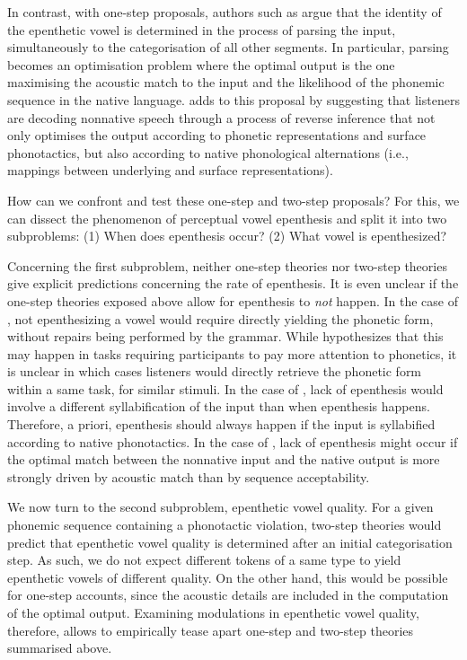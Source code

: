In contrast, with one-step proposals, authors such as \cite{dupoux2011} argue that the identity of the epenthetic vowel is determined in the process of parsing the input, simultaneously to the categorisation of all other segments. In particular, parsing becomes an optimisation problem where the optimal output is the one maximising the acoustic match to the input and the likelihood of the phonemic sequence in the native language. \cite{durvasula2015} adds to this proposal by suggesting that listeners are decoding nonnative speech through a process of reverse inference that not only optimises the output according to phonetic representations and surface phonotactics, but also according to native phonological alternations (i.e., mappings between underlying and surface representations). 

How can we confront and test these one-step and two-step proposals? For this, we can dissect the phenomenon of perceptual vowel epenthesis and split it into two subproblems: (1) When does epenthesis occur? (2) What vowel is epenthesized?

Concerning the first subproblem, neither one-step theories nor two-step theories give explicit predictions concerning the rate of epenthesis. It is even unclear if the one-step theories exposed above allow for epenthesis to \textit{not} happen. In the case of \cite{berent2007}, not epenthesizing a vowel would require directly yielding the phonetic form, without repairs being performed by the grammar. While \cite{berent2007} hypothesizes that this may happen in tasks requiring participants to pay more attention to phonetics, it is unclear in which cases listeners would directly retrieve the phonetic form within a same task, for similar stimuli. In the case of \cite{monahan2009}, lack of epenthesis would involve a different syllabification of the input than when epenthesis happens. Therefore, a priori, epenthesis should always happen if the input is syllabified according to native phonotactics. In the case of \cite{dupoux2011}, lack of epenthesis might occur if the optimal match between the nonnative input and the native output is more strongly driven by acoustic match than by sequence acceptability.   

We now turn to the second subproblem, epenthetic vowel quality. For a given phonemic sequence containing a phonotactic violation, two-step theories would predict that epenthetic vowel quality is determined after an initial categorisation step. As such, we do not expect different tokens of a same type to yield epenthetic vowels of different quality. On the other hand, this would be possible for one-step accounts, since the acoustic details are included in the computation of the optimal output. Examining modulations in epenthetic vowel quality, therefore, allows to empirically tease apart one-step and two-step theories summarised above.      

